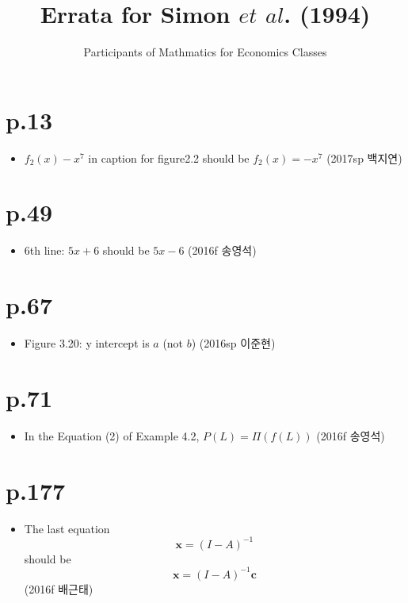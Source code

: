 \documentclass[a4paper]{article}
\title{Errata for Simon $et$ $al$. (1994)}
\author{Participants of Mathmatics for Economics Classes}
\begin{document}
\maketitle

\section{p.13} %
\label{sec:p_13}
\begin{itemize}
	\item $f_2(x) - x^7$ in caption for figure2.2 should be $f_2(x)=-x^7$ (2017sp 백지연)
\end{itemize}

\section{p.49} %
\label{sec:p49}
\begin{itemize}
	\item 6th line: $5x+6$ should be $5x-6$ (2016f 송영석)
\end{itemize}

\section{p.67} %
\label{sec:p67}
\begin{itemize}
	\item Figure 3.20: y intercept is $a$ (not $b$) (2016sp 이준현)
\end{itemize}

\section{p.71} %
\label{sec:p_71}
\begin{itemize}
	\item In the Equation (2) of Example 4.2, $P(L) = \Pi(f(L))$ (2016f 송영석)
\end{itemize}

\section{p.177} %
\label{sec:p_177}
\begin{itemize}
	\item The last equation
	\[
		\mathbf{x}=(I-A)^{-1}
	\]
	should be
	\[
		\mathbf{x}=(I-A)^{-1}\mathbf{c}
	\]
	(2016f 배근태)
\end{itemize}
\end{document}

